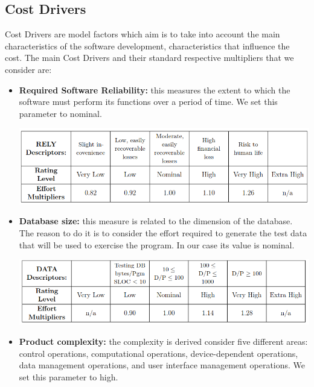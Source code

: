 \subsection{Cost Drivers}
Cost Drivers are model factors which aim is to take into account the main characteristics of the software development, characteristics that influence the cost.
The main Cost Drivers and their standard respective multipliers that we consider are:
\begin{itemize}
\item \textbf{Required Software Reliability:} this measures the extent to which the software must perform its functions over a period of time. We set this parameter to nominal.

\begin{minipage}{\textwidth}
\includegraphics[width=\linewidth-1cm, keepaspectratio]{../images/cost_driver/RELY.png}
\end{minipage}
\item \textbf{Database size:} this measure is related to the dimension of the database. The reason to do it is to consider the effort required to generate the test data that will be used to exercise the program. In our case its value is nominal.

\begin{minipage}{\textwidth}
\includegraphics[width=\linewidth-1cm, keepaspectratio]{../images/cost_driver/data.png}
\end{minipage}
\item \textbf{Product complexity:} the complexity is derived consider five different areas: control operations, computational operations, device-dependent operations, data management operations, and user interface management operations. We set this parameter to high.


\end{itemize}
